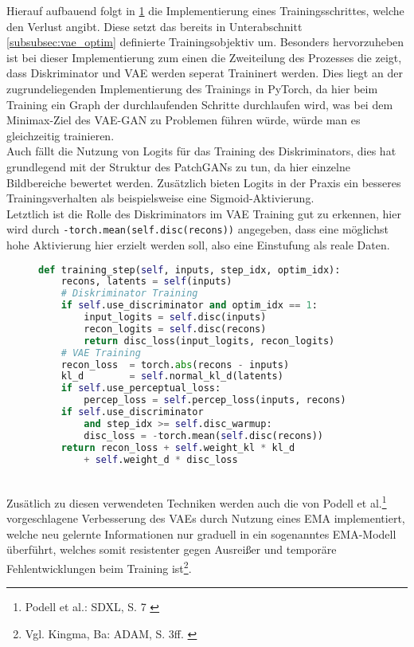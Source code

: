 Hierauf aufbauend folgt in \ref{fig:vae_training} die Implementierung eines Trainingsschrittes, welche den Verlust angibt. Diese setzt das bereits in Unterabschnitt \ref{subsubsec:vae_optim} definierte Trainingsobjektiv um. Besonders hervorzuheben ist bei dieser Implementierung zum einen die Zweiteilung des Prozesses die zeigt, dass Diskriminator und VAE werden seperat Traininert werden. Dies liegt an der zugrundeliegenden Implementierung des Trainings in PyTorch, da hier beim Training ein Graph der durchlaufenden Schritte durchlaufen wird, was bei dem Minimax-Ziel des VAE-GAN zu Problemen führen würde, würde man es gleichzeitig trainieren. \\ 
Auch fällt die Nutzung von Logits für das Training des Diskriminators, dies hat grundlegend mit der Struktur des PatchGANs zu tun, da hier einzelne Bildbereiche bewertet werden. Zusätzlich bieten Logits in der Praxis ein besseres Trainingsverhalten als beispielsweise eine Sigmoid-Aktivierung. \\
Letztlich ist die Rolle des Diskriminators im VAE Training gut zu erkennen, hier wird durch \texttt{-torch.mean(self.disc(recons))} angegeben, dass eine möglichst hohe Aktivierung hier erzielt werden soll, also eine Einstufung als reale Daten. 
\begin{figure}[htbp]
\begin{lstlisting}[language=python]
def training_step(self, inputs, step_idx, optim_idx):
    recons, latents = self(inputs)
    # Diskriminator Training 
    if self.use_discriminator and optim_idx == 1:
        input_logits = self.disc(inputs)
        recon_logits = self.disc(recons)
        return disc_loss(input_logits, recon_logits)
    # VAE Training
    recon_loss  = torch.abs(recons - inputs)
    kl_d        = self.normal_kl_d(latents)      
    if self.use_perceptual_loss:   
        percep_loss = self.percep_loss(inputs, recons)
    if self.use_discriminator 
        and step_idx >= self.disc_warmup:    
        disc_loss = -torch.mean(self.disc(recons))
    return recon_loss + self.weight_kl * kl_d 
        + self.weight_d * disc_loss 
\end{lstlisting}
    \captionsetup{type=figure}
    \label{fig:vae_training}
\end{figure} \\
Zusätlich zu diesen verwendeten Techniken werden auch die von Podell et al.\footnote{
    Podell et al.: SDXL, S. 7 
    \cite{podell2023sdxlimprovinglatentdiffusion}
} vorgeschlagene Verbesserung des VAEs durch Nutzung eines EMA implementiert, welche neu gelernte Informationen nur graduell in ein sogenanntes EMA-Modell überführt, welches somit resistenter gegen Ausreißer und temporäre Fehlentwicklungen beim Training ist\footnote{
    Vgl. Kingma, Ba: ADAM, S. 3ff. 
    \cite{kingma2017adammethodstochasticoptimization}
}. 


